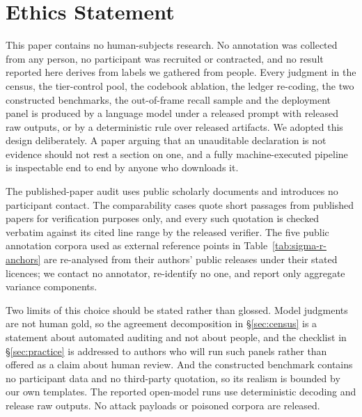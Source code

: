 \documentclass[11pt]{article}
\begin{document}
\section*{Ethics Statement}

This paper contains no human-subjects research. No annotation was collected from
any person, no participant was recruited or contracted, and no result reported
here derives from labels we gathered from people. Every judgment in the census,
the tier-control pool, the codebook ablation, the ledger re-coding, the two
constructed benchmarks, the out-of-frame recall sample and the deployment panel
is produced by a language model under a released prompt with released raw
outputs, or by a deterministic rule over released artifacts. We adopted this
design deliberately. A paper arguing that an unauditable declaration is not
evidence should not rest a section on one, and a fully machine-executed pipeline
is inspectable end to end by anyone who downloads it.

The published-paper audit uses public scholarly documents and introduces no
participant contact. The comparability cases quote short passages from published
papers for verification purposes only, and every such quotation is checked
verbatim against its cited line range by the released verifier. The five public
annotation corpora used as external reference points in
Table~\ref{tab:sigma-r-anchors} are re-analysed from their authors' public
releases under their stated licences; we contact no annotator, re-identify no
one, and report only aggregate variance components.

Two limits of this choice should be stated rather than glossed. Model judgments
are not human gold, so the agreement decomposition in \S\ref{sec:census} is a
statement about automated auditing and not about people, and the checklist in
\S\ref{sec:practice} is addressed to authors who will run such panels rather
than offered as a claim about human review. And the constructed benchmark
contains no participant data and no third-party quotation, so its realism is
bounded by our own templates. The reported open-model runs use deterministic
decoding and release raw outputs. No attack payloads or poisoned corpora are
released.

\clearpage


\clearpage
\appendix


\end{document}
